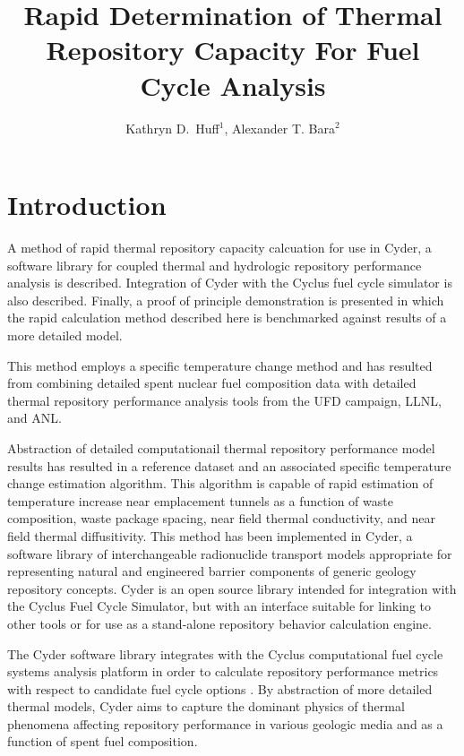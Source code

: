 \documentclass{anstrans}
\title{Rapid Determination of Thermal Repository Capacity For Fuel Cycle Analysis}
\author{Kathryn D.~Huff$^1$, Alexander T. Bara$^2$}
\institute{$^1$Univ. of Wisconsin, 1500 Engineering Dr., Madison, WI, 53706\\ 
\& Argonne National Laboratory, 9700 S. Cass Ave., Lemont, IL, katyhuff@gmail.com\\
$^2$Univ. of Illinois, Urbana Champaign, IL, 61801, bara1@illinois.edu}
\date{}
\begin{document}
\section{Introduction}

A method of rapid thermal repository capacity calcuation for use in Cyder, a 
software library for coupled thermal and hydrologic repository performance 
analysis is described. Integration of Cyder with the Cyclus fuel cycle simulator 
is also described. Finally, a proof of principle demonstration is presented in 
which the rapid calculation method described here is benchmarked against results 
of a more detailed model.

This method employs a specific temperature change method \cite{radel} and has 
resulted from combining detailed spent nuclear fuel composition data with 
detailed thermal repository performance analysis 
tools from the \gls{UFD} campaign, \gls{LLNL}, and 
\gls{ANL}\cite{radel,llnl,sinda,carter}.

Abstraction of detailed computationail thermal repository performance model 
results has resulted in a reference dataset and an associated specific 
temperature change estimation algorithm. This algorithm is capable of rapid 
estimation of temperature increase near emplacement tunnels as a function of 
waste composition, waste package spacing, near field thermal conductivity, and 
near field thermal diffusitivity.  This method has been implemented in Cyder, a 
software library of interchangeable radionuclide transport models appropriate 
for representing natural and engineered barrier components of generic geology 
  repository concepts.  Cyder is an open source library intended for integration 
  with the Cyclus Fuel Cycle Simulator, but with an interface suitable for 
  linking to other tools or for use as a stand-alone repository behavior 
  calculation engine. 

The Cyder software library integrates with 
the Cyclus computational fuel cycle systems analysis platform in order to 
calculate repository performance metrics with respect to candidate fuel cycle 
options \cite{huff_cyder_2012,huff_cyclus:_2010}. By abstraction of more 
detailed thermal models, Cyder aims to capture the dominant 
physics of thermal phenomena affecting repository performance in 
various geologic media and as a function of spent fuel composition.
\end{document}
